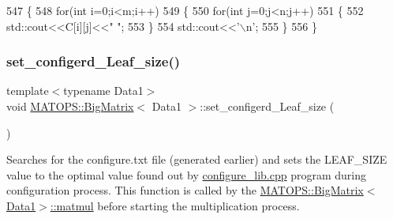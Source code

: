 \begin{DoxyCode}
547                         \{
548                                 \textcolor{keywordflow}{for}(\textcolor{keywordtype}{int} i=0;i<m;i++)
549                                 \{
550                                         \textcolor{keywordflow}{for}(\textcolor{keywordtype}{int} j=0;j<n;j++)
551                                         \{
552                                                 std::cout<<C[i][j]<<\textcolor{stringliteral}{" "};
553                                         \}
554                                         std::cout<<\textcolor{charliteral}{'\(\backslash\)n'};
555                                 \}
556                         \}
\end{DoxyCode}
\mbox{\label{classMATOPS_1_1BigMatrix_a89f5328b2686ef2a0dfaa9c2bd852d37}} 
\subsubsection{\texorpdfstring{set\+\_\+configerd\+\_\+\+Leaf\+\_\+size()}{set\_configerd\_Leaf\_size()}}
{\footnotesize\ttfamily template$<$typename Data1$>$ \\
void \hyperlink{classMATOPS_1_1BigMatrix}{M\+A\+T\+O\+P\+S\+::\+Big\+Matrix}$<$ Data1 $>$\+::set\+\_\+configerd\+\_\+\+Leaf\+\_\+size (\begin{DoxyParamCaption}{ }\end{DoxyParamCaption})\hspace{0.3cm}{\ttfamily [inline]}}



Searches for the configure.\+txt file (generated earlier) and sets the L\+E\+A\+F\+\_\+\+S\+I\+ZE value to the optimal value found out by \hyperlink{configure__lib_8cpp}{configure\+\_\+lib.\+cpp} program during configuration process. This function is called by the \hyperlink{classMATOPS_1_1BigMatrix_ac793236874a8ccfd66e21006011b9cff}{M\+A\+T\+O\+P\+S\+::\+Big\+Matrix$<$\+Data1$>$\+::matmul} before starting the multiplication process. 


